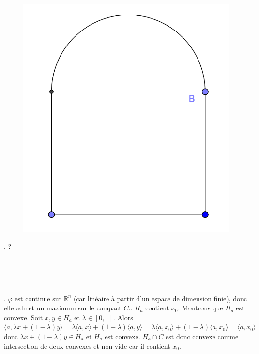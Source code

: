 \documentclass{report}
\begin{document}
\begin{figure}[t]
\includegraphics[scale=0.5]{1}
\centering 
\end{figure}

. ?


\newpage
\subsection{} \noindent{}\\ 
\\ 
\\
. $\varphi$ est continue sur $\mathbb R^n$ (car linéaire à partir d'un espace de dimension finie), donc elle admet un maximum sur le compact $C$.. $H_a$ contient $x_0$. Montrons que $H_a$ est convexe. Soit $x,y\in H_a$ et $\lambda\in [0,1]$. Alors $\langle a,\lambda x +(1-\lambda)y\rangle = \lambda \langle a,x\rangle + (1-\lambda) \langle a,y\rangle = \lambda \langle a,x_0\rangle + (1-\lambda) \langle a,x_0\rangle = \langle a,x_0\rangle$ donc $\lambda x +(1-\lambda)y\in H_a$ et $H_a$ est convexe.\newline 
$H_a\cap C$ est donc convexe comme intersection de deux convexes et non vide car il contient $x_0$.
\end{document}
